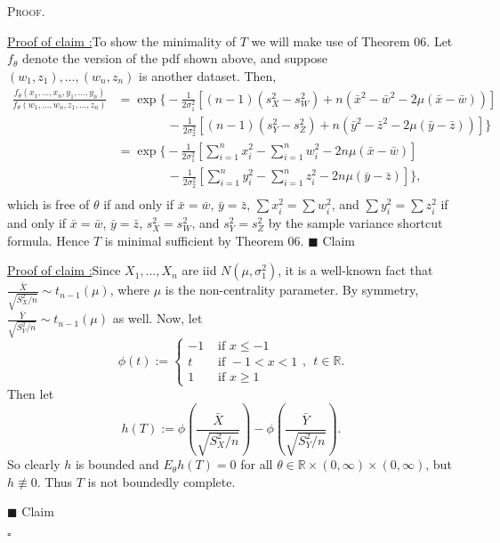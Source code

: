 \documentclass[12pt]{article}
\newcounter{ProofCounter}
\newcounter{ClaimCounter}[ProofCounter]
\newenvironment{Proof}{\stepcounter{ProofCounter}\textsc{Proof.}}{\hfill$\square$}
\newenvironment{claim}[1]{\vspace{1mm}\stepcounter{ClaimCounter}\par\noindent\underline{\bf Claim \theClaimCounter:}\space#1}{}
\newenvironment{claimproof}[1]{\par\noindent\underline{Proof of claim \theClaimCounter:}\space#1}{\hfill $\blacksquare$ Claim \theClaimCounter}
\begin{document}
\begin{Proof}
  \begin{claimproof}
    To show the minimality of $T$ we will make use of Theorem 06. Let $f_{\theta}$ denote the
    version of the pdf shown above, and suppose
    $(w_1, z_1), \dots, (w_n, z_n)$ is another dataset. Then,
    \begin{align*}
      \frac{f_{\theta}(x_1, \dots, x_n, y_1, \dots, y_n)}{ f_{\theta}(w_1, \dots, w_n, z_1, \dots, z_n)} & =
      \exp\bigg\{ -\frac{1}{2\sigma_{1}^{2}}\left[ (n-1)(s_{X}^{2} - s_{W}^{2}) + n(\bar{x}^{2} - \bar{w}^{2} - 2\mu(\bar{x} - \bar{w})) \right] \\
        & \qquad \qquad - \frac{1}{2\sigma_{2}^{2}}\left[ (n-1)(s_{Y}^{2} - s_{Z}^{2}) + n(\bar{y}^{2} - \bar{z}^{2} - 2\mu(\bar{y} - \bar{z}))
      \right]\bigg\} \\
      & = \exp\bigg\{ -\frac{1}{2\sigma_{1}^{2}}\left[ \sum_{i=1}^{n}x_{i}^{2}-\sum_{i=1}^{n}w_{i}^{2} - 2n\mu(\bar{x} - \bar{w}) \right] \\
        & \qquad \qquad - \frac{1}{2\sigma_{2}^{2}}\left[ \sum_{i=1}^{n}y_{i}^{2}-\sum_{i=1}^{n}z_{i}^{2} - 2n\mu(\bar{y} - \bar{z})
      \right]\bigg\}, \\
    \end{align*}
    which is free of $\theta$ if and only if $\bar{x} = \bar{w}$, $\bar{y} = \bar{z}$, $\sum x_{i}^{2} = \sum w_{i}^{2}$, and $\sum y_{i}^{2} = \sum
    z_{i}^{2}$ if and only if $\bar{x} = \bar{w}$, $\bar{y} = \bar{z}$, $s_{X}^{2} = s_{W}^{2}$, and $s_{Y}^{2} = s_{Z}^{2}$ by the sample variance
    shortcut formula. Hence $T$ is minimal sufficient by Theorem 06.
  \end{claimproof}

  \begin{claimproof}
    Since $X_{1},\dots, X_{n}$ are iid $N(\mu, \sigma_{1}^{2})$, it is a well-known fact that $\frac{\bar{X}}{\sqrt{S_{X}^{2} / n}} \sim
    t_{n-1}(\mu)$, where $\mu$ is the non-centrality parameter. By symmetry, $\frac{\bar{Y}}{\sqrt{S_{Y}^{2} / n}} \sim t_{n-1}(\mu)$ as well.
    Now, let 
    \[
      \phi(t) := \left\{ \begin{array}{cl}
          -1 & \text{ if } x \leq -1 \\
          t & \text{ if } -1 < x < 1 \\
          1 & \text{ if } x \geq 1
      \end{array} \right., \ \ t \in \mathbb{R}.
    \]
    Then let 
    \[
      h(T) := \phi\left( \frac{\bar{X}}{\sqrt{S_{X}^{2} / n}} \right) - \phi\left( \frac{\bar{Y}}{\sqrt{S_{Y}^{2}/n}} \right).
    \]
    So clearly $h$ is bounded and $E_{\theta}h(T) = 0$ for all $\theta \in \mathbb{R} \times (0,\infty) \times (0,\infty)$, but $h \not\equiv 0$. Thus $T$ is not boundedly complete.

  \end{claimproof}

\end{Proof}
\end{document}
